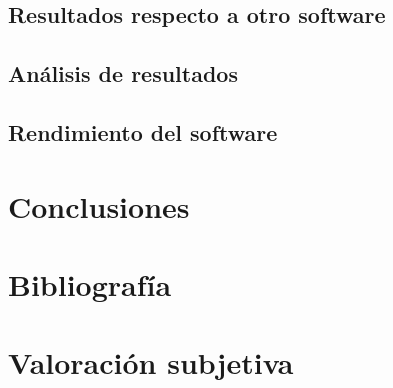 \documentclass[11pt, titlepage,a4paper]{article}
\begin{document}
\subsection{Resultados respecto a otro software}

\subsection{Análisis de resultados}

\subsection{Rendimiento del software}

\section{Conclusiones}

\section{Bibliografía}
%

\section{Valoración subjetiva}

\end{document}
